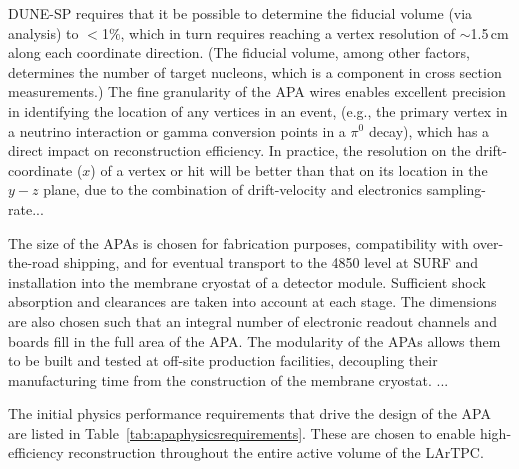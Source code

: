 DUNE-SP requires that it be possible to determine the fiducial volume (via analysis) to $<$1$\%$, which in turn requires reaching a vertex resolution of $\sim$1.5\,cm along each coordinate direction. (The fiducial volume, among other factors, determines the number of target nucleons, which is a component in cross section measurements.) 
The fine granularity of the APA wires enables excellent precision in identifying the location of any vertices in an event, (e.g., the primary vertex in a neutrino interaction or gamma conversion points in a $\pi^{0}$ decay), which has a direct impact on reconstruction efficiency.
In practice, the resolution on the drift-coordinate ($x$) of a vertex or hit will be better than that on its location in the $y-z$ plane, due to the combination of drift-velocity and electronics sampling-rate...

The size of the APAs is chosen for fabrication purposes, compatibility with over-the-road shipping, and for eventual transport to the 4850 level at SURF and installation into the membrane cryostat of a detector module. Sufficient shock absorption and clearances are taken into account at each stage.  The dimensions are also chosen such that an integral number of electronic readout channels and boards fill in the full area of the APA. The modularity of the APAs allows them to be built and tested at off-site production facilities, decoupling their manufacturing time from the construction of the membrane cryostat. 
...


The initial physics performance requirements that drive the design of the APA are listed in Table~\ref{tab:apaphysicsrequirements}.  These are chosen to enable high-efficiency reconstruction throughout the entire active volume of the LArTPC.  

